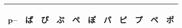 \begin{table}[H]
\begin{tabular}{l|ccccc|ccccc}
        p-- & {\begin{CJK}{UTF8}{min} ぱ \end{CJK}} & {\begin{CJK}{UTF8}{min} ぴ \end{CJK}} & {\begin{CJK}{UTF8}{min} ぷ \end{CJK}} & {\begin{CJK}{UTF8}{min} ぺ \end{CJK}} & {\begin{CJK}{UTF8}{min} ぽ \end{CJK}} & {\begin{CJK}{UTF8}{min} パ \end{CJK}} & {\begin{CJK}{UTF8}{min} ピ \end{CJK}} & {\begin{CJK}{UTF8}{min} プ \end{CJK}} & {\begin{CJK}{UTF8}{min} ペ \end{CJK}} & {\begin{CJK}{UTF8}{min} ポ \end{CJK}} \\
		\bottomrule
	\end{tabular}
\end{table}


